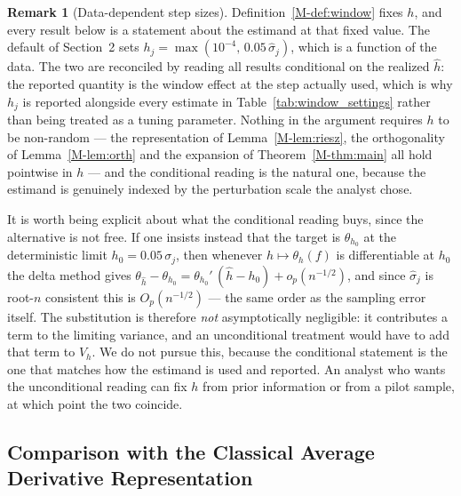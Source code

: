 \documentclass[12pt,a4paper]{article}
\numberwithin{equation}{section}
\theoremstyle{plain}
\theoremstyle{definition}
\newtheorem{remark}{Remark}
\begin{document}
	\begin{remark}[Data-dependent step sizes]
		\label{rem:randomh}
		Definition~\ref{M-def:window} fixes $h$, and every result below is a
		statement about the estimand at that fixed value. The default of
		Section~2 sets $h_j = \max(10^{-4},\, 0.05\,\hat{\sigma}_j)$, which is a
		function of the data. The two are reconciled by reading all results
		conditional on the realized $\hat{h}$: the reported quantity is the
		window effect at the step actually used, which is why $h_j$ is reported
		alongside every estimate in Table~\ref{tab:window_settings} rather than
		being treated as a tuning parameter. Nothing in the argument requires
		$h$ to be non-random --- the representation of
		Lemma~\ref{M-lem:riesz}, the orthogonality of Lemma~\ref{M-lem:orth} and the
		expansion of Theorem~\ref{M-thm:main} all hold pointwise in $h$ --- and
		the conditional reading is the natural one, because the estimand is
		genuinely indexed by the perturbation scale the analyst chose.

		It is worth being explicit about what the conditional reading buys,
		since the alternative is not free. If one insists instead that the
		target is $\theta_{h_0}$ at the deterministic limit
		$h_0 = 0.05\,\sigma_j$, then whenever $h \mapsto \theta_h(f)$ is
		differentiable at $h_0$ the delta method gives
		$\theta_{\hat{h}} - \theta_{h_0} = \theta_{h_0}'\,(\hat{h} - h_0) +
		o_p(n^{-1/2})$, and since $\hat{\sigma}_j$ is root-$n$ consistent this
		is $O_p(n^{-1/2})$ --- the same order as the sampling error itself. The
		substitution is therefore \emph{not} asymptotically negligible: it
		contributes a term to the limiting variance, and an unconditional
		treatment would have to add that term to $V_h$. We do not pursue this,
		because the conditional statement is the one that matches how the
		estimand is used and reported. An analyst who wants the unconditional
		reading can fix $h$ from prior information or from a pilot sample, at
		which point the two coincide.
	\end{remark}

	\subsection{Comparison with the Classical Average Derivative Representation}
\end{document}
